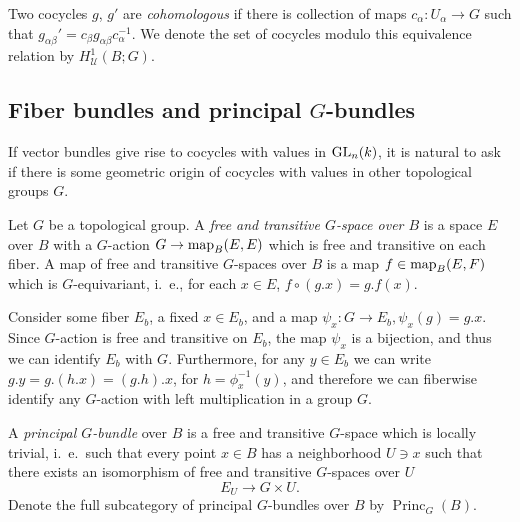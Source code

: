 \documentclass[a4paper,openany]{scrbook}
\DeclareMathOperator{\Princ}{Princ}
\begin{document}
\begin{defn} Two cocycles $g$, $g'$ are \emph{cohomologous} if there is collection of maps $c_\alpha\colon U_{\alpha} \to G$ such that $g_{\alpha\beta}' = c_\beta g_{\alpha\beta} c_\alpha^{-1}$. We denote the set of cocycles modulo this equivalence relation by $H^1_{\mathcal U}(B;G)$.
\end{defn}

\subsection{Fiber bundles and principal $G$-bundles}

If vector bundles give rise to cocycles with values in $\operatorname{GL}_n(k)$, it is natural to ask if there is some geometric origin of cocycles with values in other topological groups $G$.

\begin{defn}
  Let $G$ be a topological group. A \emph{free and transitive $G$-space over $B$} is a space $E$ over $B$ with a $G$-action $G \to \operatorname{map}_B(E,E)$ which is free and transitive on each fiber. A map of free and transitive $G$-spaces over $B$ is a map $f\in\operatorname{map}_B(E,F)$ which is $G$-equivariant, i.~e., for each $x \in E$, $f \circ (g.x) = g.f(x)$. 

Consider some fiber $E_b$, a fixed $x \in E_b$, and a map $\psi_x\colon G \to E_b, \psi_x(g) = g.x$. Since $G$-action is free and transitive on $E_b$, the map $\psi_x$ is a bijection, and thus we can identify $E_b$ with $G$. Furthermore, for any $y \in E_b$ we can write $g.y = g.(h.x)=(g.h).x$, for $h=\phi_x^{-1}(y)$, and therefore we can fiberwise identify any $G$-action with left multiplication in a group $G$.

A \emph{principal $G$-bundle} over $B$ is a free and transitive $G$-space which is locally trivial, i.~e.\ such that every point $x \in B$ has a neighborhood $U \ni x$ such that there exists an isomorphism of free and transitive $G$-spaces over $U$
\[
E_U \to G \times U.
\]
Denote the full subcategory of principal $G$-bundles over $B$ by $\Princ_G(B)$.
\end{defn}
\end{document}
